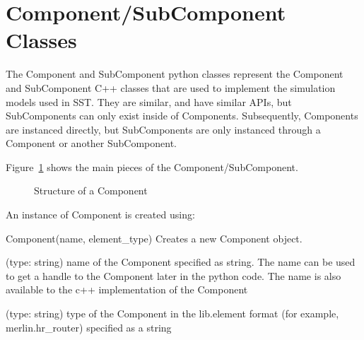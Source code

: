\section{Component/SubComponent Classes}

The Component and SubComponent python classes represent the Component
and SubComponent C++ classes that are used to implement the simulation
models used in SST.  They are similar, and have similar APIs, but
SubComponents can only exist inside of Components.  Subsequently,
Components are instanced directly, but SubComponents are only
instanced through a Component or another SubComponent.


Figure~\ref{fig:component-structure} shows the main pieces of the
Component/SubComponent.

\begin{figure}[h]
  \centering
   \hspace{1in}
  \caption[Structure of a Component]{Structure of a Component}
  \label{fig:component-structure}
\end{figure}

An instance of Component is created using:


\begin{functiondoc}{Component(name, element_type)}
  {Creates a new Component object.}

   (type: string) name of the Component specified as
  string.  The name can be used to get a handle to the Component later
  in the python code.  The name is also available to the c++
  implementation of the Component

   (type: string) type of the Component in the
  lib.element format (for example, merlin.hr\_router) specified as a
  string

\end{functiondoc}

